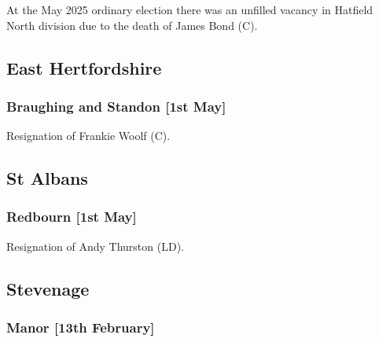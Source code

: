 \documentclass[a4paper,openany]{book}
\begin{document}
\begin{resultsiii}
At the May 2025 ordinary election there was an unfilled vacancy in Hatfield North division due to the death of James Bond (C).%

\subsection*{East Hertfordshire}

\subsubsection*{Braughing and Standon \hspace*{\fill}\nolinebreak[1]%
	\enspace\hspace*{\fill}
	[1st May]}


Resignation of Frankie Woolf (C).

\subsection*{St Albans}

\subsubsection*{Redbourn \hspace*{\fill}\nolinebreak[1]%
	\enspace\hspace*{\fill}
	[1st May]}


Resignation of Andy Thurston (LD).

\subsection*{Stevenage}

\subsubsection*{Manor \hspace*{\fill}\nolinebreak[1]%
	\enspace\hspace*{\fill}
	[13th February]}



\end{resultsiii}
\end{document}
